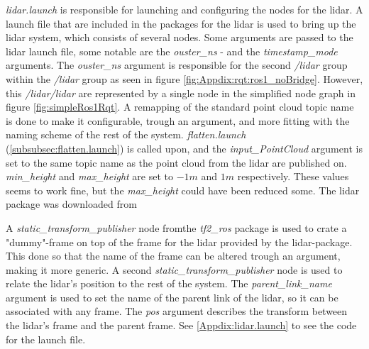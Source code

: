 \label{subsubsec:lidar.launch}
\textit{lidar.launch} is responsible for launching and configuring the nodes for the lidar. A launch file that are included in the packages for the lidar is used to bring up the lidar system, which  consists of several nodes. Some arguments are passed to the lidar launch file, some notable are the \textit{ouster\_ns} - and the  \textit{timestamp\_mode} arguments. The \textit{ouster\_ns} argument is responsible for the second \textit{/lidar} group within the \textit{/lidar} group as seen in figure \ref{fig:Appdix:rqt:ros1_noBridge}. However, this \textit{/lidar/lidar} are represented by a single node in the simplified node graph in figure \ref{fig:simpleRos1Rqt}. A remapping of the standard point cloud topic name is done to make it configurable, trough an argument, and more fitting with the naming scheme of the rest of the system. \textit{flatten.launch} (\ref{subsubsec:flatten.launch}) is called upon, and the \textit{input\_PointCloud} argument is set to the same topic name as the point cloud from the lidar are published on. \textit{min\_height} and \textit{max\_height} are set to $-1 m$ and $1 m$ respectively. These values seems to work fine, but the \textit{max\_height} could have been reduced some. The lidar package was downloaded from \cite{ouster-ros-driver}

A \textit{static\_transform\_publisher} node fromthe \textit{tf2\_ros} package is used to crate a "dummy"-frame on top of the frame for the lidar provided by the lidar-package. This done so that the name of the frame can be altered trough an argument, making it more generic. A second \textit{static\_transform\_publisher} node is used to relate the lidar's position to the rest of the system. The \textit{parent\_link\_name} argument is used to set the name of the parent link of the lidar, so it can be associated with any frame. The \textit{pos} argument describes the transform between the lidar's frame and the parent frame. See \ref{Appdix:lidar.launch} to see the code for the launch file.

